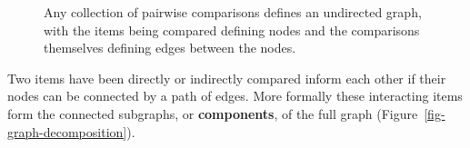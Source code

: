 \documentclass[
  letterpaper,
  DIV=11,
  numbers=noendperiod]{scrartcl}
\begin{document}
\begin{figure}


\caption{\label{fig-graph}Any collection of pairwise comparisons defines
an undirected graph, with the items being compared defining nodes and
the comparisons themselves defining edges between the nodes.}

\end{figure}%

Two items have been directly or indirectly compared inform each other if
their nodes can be connected by a path of edges. More formally these
interacting items form the connected subgraphs, or \textbf{components},
of the full graph (Figure~\ref{fig-graph-decomposition}).
\end{document}
